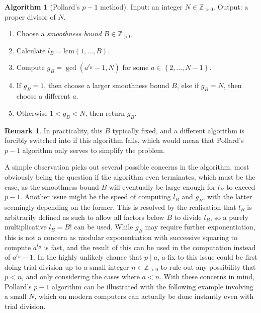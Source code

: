 \documentclass{article}
\newcommand{\Z}{\mathbb{Z}}
\newcommand{\rb}[1]{\left( #1 \right)}
\newcommand{\cb}[1]{\left\{ #1 \right\}}
\theoremstyle{definition}\newtheorem*{definition}{Definition}
\theoremstyle{definition}\newtheorem*{example}{Example}
\theoremstyle{definition}\newtheorem*{remark}{Remark}
\newtheorem{algorithm}[proposition]{Algorithm}
\begin{document}
\begin{algorithm}[Pollard's $ p - 1 $ method]
Input: an integer $ N \in \Z_{> 0} $. Output: a proper divisor of $ N $.
\begin{enumerate}
\item Choose a \emph{smoothness bound} $ B \in \Z_{> 0} $.
\item Calculate $ l_B = \text{lcm}\rb{1, \dots, B} $.
\item Compute $ g_B = \gcd\rb{a^{l_B} - 1, N} $ for some $ a \in \cb{2, \dots, N - 1} $.
\item If $ g_B = 1 $, then choose a larger smoothness bound $ B $, else if $ g_B = N $, then choose a different $ a $.
\item Otherwise $ 1 < g_B < N $, then return $ g_B $.
\end{enumerate}
\end{algorithm}

\pagebreak

\begin{remark}
In practicality, this $ B $ typically fixed, and a different algorithm is forcibly switched into if this algorithm fails, which would mean that Pollard's $ p - 1 $ algorithm only serves to simplify the problem.
\end{remark}

A simple observation picks out several possible concerns in the algorithm, most obviously being the question if the algorithm even terminates, which must be the case, as the smoothness bound $ B $ will eventually be large enough for $ l_B $ to exceed $ p - 1 $. Another issue might be the speed of computing $ l_B $ and $ g_B $, with the latter seemingly depending on the former. This is resolved by the realisation that $ l_B $ is arbitrarily defined as such to allow all factors below $ B $ to divide $ l_B $, so a purely multiplicative $ l_B = B! $ can be used. While $ g_B $ may require further exponentiation, this is not a concern as modular exponentiation with successive squaring to compute $ a^{l_B} $ is fast, and the result of this can be used in the computation instead of $ a^{l_B} - 1 $. In the highly unlikely chance that $ p \mid a $, a fix to this issue could be first doing trial division up to a small integer $ n \in \Z_{> 0} $ to rule out any possibility that $ p < n $, and only considering the cases where $ a < n $. With these concerns in mind, Pollard's $ p - 1 $ algorithm can be illustrated with the following example involving a small $ N $, which on modern computers can actually be done instantly even with trial division.
\end{document}
